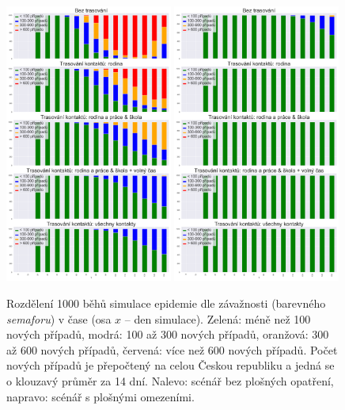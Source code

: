 \begin{figure}
  \centering
  \includegraphics[width=0.49\textwidth]{pic/bar_prubeh_history_second_exp.png}
  \hfill
  \includegraphics[width=0.49\textwidth]{pic/bar_prubeh_history_second_expB.png}
  \caption{Rozdělení 1000 běhů simulace epidemie dle závažnosti (barevného {\em
      semaforu}) v čase (osa $x$ -- den simulace). Zelená: méně než 100 nových
    případů, modrá: 100 až 300 nových případů, oranžová: 300 až 600 nových
    případů, červená: více než 600 nových případů.  Počet nových případů je
    přepočtený na celou Českou republiku a jedná se o klouzavý průměr za 14
    dní. Nalevo: scénář bez plošných opatření, napravo: scénář s plošnými omezeními.}
  \label{pg:fig:exp1ab}
\end{figure}


